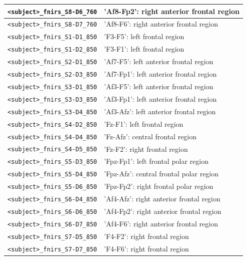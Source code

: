 \begin{table}
\begin{tabularx}{\textwidth}{|l|X|}
  \hline
  \texttt{<subject>\_fnirs\_S8-D6\_760} & 'Af8-Fp2': right anterior frontal region  \\
  \hline
  \texttt{<subject>\_fnirs\_S8-D7\_760} & 'Af8-F6': right anterior frontal region  \\
  \hline
  \texttt{<subject>\_fnirs\_S1-D1\_850} & 'F3-F5': left frontal region  \\
  \hline
  \texttt{<subject>\_fnirs\_S1-D2\_850} & 'F3-F1': left frontal region  \\
  \hline
  \texttt{<subject>\_fnirs\_S2-D1\_850} & 'Af7-F5': left anterior frontal region  \\
  \hline
  \texttt{<subject>\_fnirs\_S2-D3\_850} & 'Af7-Fp1': left anterior frontal region  \\
  \hline
  \texttt{<subject>\_fnirs\_S3-D1\_850} & 'Af3-F5': left anterior frontal region  \\
  \hline
  \texttt{<subject>\_fnirs\_S3-D3\_850} & 'Af3-Fp1': left anterior frontal region  \\
  \hline
  \texttt{<subject>\_fnirs\_S3-D4\_850} & 'Af3-Afz': left anterior frontal region  \\
  \hline
  \texttt{<subject>\_fnirs\_S4-D2\_850} & 'Fz-F1': left frontal region  \\
  \hline
  \texttt{<subject>\_fnirs\_S4-D4\_850} & 'Fz-Afz': central frontal region  \\
  \hline
  \texttt{<subject>\_fnirs\_S4-D5\_850} & 'Fz-F2': right frontal region  \\
  \hline
  \texttt{<subject>\_fnirs\_S5-D3\_850} & 'Fpz-Fp1': left frontal polar region  \\
  \hline
  \texttt{<subject>\_fnirs\_S5-D4\_850} & 'Fpz-Afz': central frontal polar region  \\
  \hline
  \texttt{<subject>\_fnirs\_S5-D6\_850} & 'Fpz-Fp2': right frontal polar region  \\
  \hline
  \texttt{<subject>\_fnirs\_S6-D4\_850} & 'Af4-Afz': right anterior frontal region  \\
  \hline
  \texttt{<subject>\_fnirs\_S6-D6\_850} & 'Af4-Fp2': right anterior frontal region  \\
  \hline
  \texttt{<subject>\_fnirs\_S6-D7\_850} & 'Af4-F6': right anterior frontal region  \\
  \hline
  \texttt{<subject>\_fnirs\_S7-D5\_850} & 'F4-F2': right frontal region  \\
  \hline
  \texttt{<subject>\_fnirs\_S7-D7\_850} & 'F4-F6': right frontal region  \\

\end{tabularx}
\end{table}
